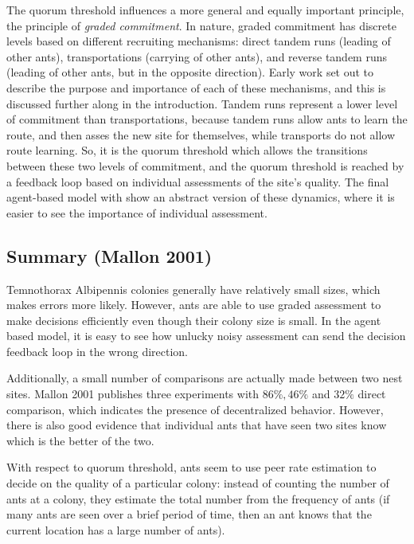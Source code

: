 \documentclass{article}
\begin{document}
The quorum threshold influences a more general and equally important principle, the principle of \emph{graded commitment}.
In nature, graded commitment has discrete levels based on different recruiting mechanisms: direct tandem runs (leading of other ants), transportations (carrying of other ants), and reverse tandem runs (leading of other ants, but in the opposite direction). 
Early work set out to describe the purpose and importance of each of these mechanisms, and this is discussed further along in the introduction.
Tandem runs represent a lower level of commitment than transportations, because tandem runs allow ants to learn the route, and then asses the new site for themselves, while transports do not allow route learning.
So, it is the quorum threshold which allows the transitions between these two levels of commitment, and the quorum threshold is reached by a feedback loop based on individual assessments of the site's quality. The final agent-based model with show an abstract version of these dynamics, where it is easier to see the importance of individual assessment.

\subsection{Summary (Mallon 2001)}

Temnothorax Albipennis colonies generally have relatively small sizes, which makes errors more likely. However, ants are able to use graded assessment to make decisions efficiently even though their colony size is small. In the agent based model, it is easy to see how unlucky noisy assessment can send the decision feedback loop in the wrong direction.

Additionally, a small number of comparisons are actually made between two nest sites.
Mallon 2001 publishes three experiments with $86\%, 46\%$ and $32\%$ direct comparison, which indicates the presence of decentralized behavior.
However, there is also good evidence that individual ants that have seen two sites know which is the better of the two.

With respect to quorum threshold, ants seem to use peer rate estimation to decide on the quality of a particular colony: instead of counting the number of ants at a colony, they estimate the total number from the frequency of ants (if many ants are seen over a brief period of time, then an ant knows that the current location has a large number of ants).
\end{document}
